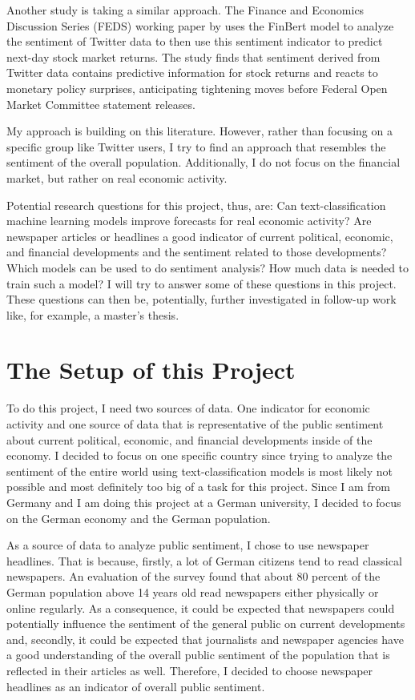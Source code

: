 \documentclass[11pt, a4paper, leqno]{article}
\begin{document}
Another study is taking a similar approach. The Finance and Economics Discussion Series (FEDS) working paper by \textcite{Adams_2023} uses the FinBert model to analyze the sentiment of Twitter data to then use this sentiment indicator to predict next-day stock market returns. The study finds that sentiment derived from Twitter data contains predictive information for stock returns and reacts to monetary policy surprises, anticipating tightening moves before Federal Open Market Committee statement releases.

My approach is building on this literature. However, rather than focusing on a specific group like Twitter users, I try to find an approach that resembles the sentiment of the overall population. Additionally, I do not focus on the financial market, but rather on real economic activity.

Potential research questions for this project, thus, are: Can text-classification machine learning models improve forecasts for real economic activity? Are newspaper articles or headlines a good indicator of current political, economic, and financial developments and the sentiment related to those developments? Which models can be used to do sentiment analysis? How much data is needed to train such a model?
I will try to answer some of these questions in this project. These questions can then be, potentially, further investigated in follow-up work like, for example, a master's thesis.

\section{The Setup of this Project}

To do this project, I need two sources of data. One indicator for economic activity and one source of data that is representative of the public sentiment about current political, economic, and financial developments inside of the economy. I decided to focus on one specific country since trying to analyze the sentiment of the entire world using text-classification models is most likely not possible and most definitely too big of a task for this project. Since I am from Germany and I am doing this project at a German university, I decided to focus on the German economy and the German population.

As a source of data to analyze public sentiment, I chose to use newspaper headlines. That is because, firstly, a lot of German citizens tend to read classical newspapers. An evaluation of the survey \textcite{Gesellschaft2022} found that about 80 percent of the German population above 14 years old read newspapers either physically or online regularly. As a consequence, it could be expected that newspapers could potentially influence the sentiment of the general public on current developments and, secondly, it could be expected that journalists and newspaper agencies have a good understanding of the overall public sentiment of the population that is reflected in their articles as well. Therefore, I decided to choose newspaper headlines as an indicator of overall public sentiment.
\end{document}
